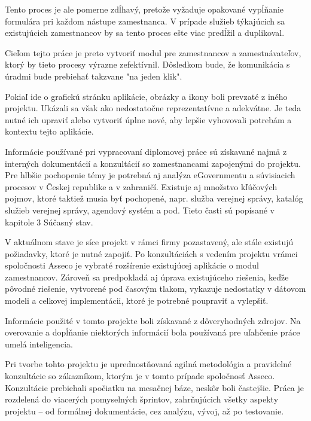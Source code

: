 Tento proces je ale pomerne zdĺhavý, pretože vyžaduje opakované vypĺňanie formulára pri každom nástupe zamestnanca. V prípade služieb týkajúcich sa existujúcich zamestnancov by sa tento proces ešte viac predĺžil a duplikoval.

Cieľom tejto práce je preto vytvoriť modul pre zamestnancov a zamestnávateľov, ktorý by tieto procesy výrazne zefektívnil. Dôsledkom bude, že komunikácia s úradmi bude prebiehať takzvane "na jeden klik".

Pokiaľ ide o grafickú stránku aplikácie, obrázky a ikony boli prevzaté z iného projektu. Ukázali sa však ako nedostatočne reprezentatívne a adekvátne. Je teda nutné ich upraviť alebo vytvoriť úplne nové, aby lepšie vyhovovali potrebám a kontextu tejto aplikácie.


Informácie používané pri vypracovaní diplomovej práce sú získavané najmä z interných dokumentácií a konzultácií so zamestnancami zapojenými do projektu. Pre hlbšie pochopenie témy je potrebná aj analýza eGovernmentu a súvisiacich procesov v Českej republike a v zahraničí. Existuje aj množstvo kľúčových pojmov, ktoré taktiež musia byť pochopené, napr. služba verejnej správy, katalóg služieb verejnej správy, agendový systém a pod. Tieto časti sú popísané v kapitole 3 Súčasný stav.


V aktuálnom stave je síce projekt v rámci firmy pozastavený, ale stále existujú požiadavky, ktoré je nutné zapojiť. Po konzultáciách s vedením projektu vrámci spoločnosti Asseco je vybraté rozšírenie existujúcej aplikácie o modul zamestnancov. Zároveň sa predpokladá aj úprava existujúceho riešenia, keďže pôvodné riešenie, vytvorené pod časovým tlakom, vykazuje nedostatky v dátovom modeli a celkovej implementácii, ktoré je potrebné poupraviť a vylepšiť.

Informácie použité v tomto projekte boli získavané z dôveryhodných zdrojov. Na overovanie a dopĺňanie niektorých informácií bola používaná pre uľahčenie práce umelá inteligencia.

Pri tvorbe tohto projektu je uprednostňovaná agilná metodológia a pravidelné konzultácie so zákazníkom, ktorým je v tomto prípade spoločnosť Asseco. Konzultácie prebiehali spočiatku na mesačnej báze, neskôr boli častejšie. Práca je rozdelená do viacerých pomyselných šprintov, zahrňujúcich všetky aspekty projektu -- od formálnej dokumentácie, cez analýzu, vývoj, až po testovanie.

